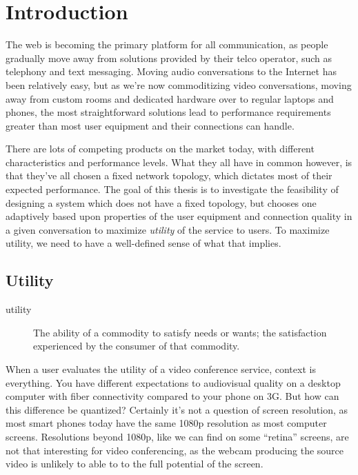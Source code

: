 \chapter{Introduction}\label{chp:introduction}

The web is becoming the primary platform for all communication, as people gradually move away from solutions provided by their telco operator, such as telephony and text messaging. Moving audio conversations to the Internet has been relatively easy, but as we're now commoditizing video conversations, moving away from custom rooms and dedicated hardware over to regular laptops and phones, the most straightforward solutions lead to performance requirements greater than most user equipment and their connections can handle.

There are lots of competing products on the market today, with different characteristics and performance levels. What they all have in common however, is that they've all chosen a fixed network topology, which dictates most of their expected performance. The goal of this thesis is to investigate the feasibility of designing a system which does not have a fixed topology, but chooses one adaptively based upon properties of the user equipment and connection quality in a given conversation to maximize \emph{utility} of the service to users. To maximize utility, we need to have a well-defined sense of what that implies.


\section{Utility}

\begin{description}

    \item[utility]  The ability of a commodity to satisfy needs or wants; the satisfaction experienced by the consumer of that commodity.
\end{description}

When a user evaluates the utility of a video conference service, context is everything. You have different expectations to audiovisual quality on a desktop computer with fiber connectivity compared to your phone on 3G. But how can this difference be quantized? Certainly it's not a question of screen resolution, as most smart phones today have the same 1080p resolution as most computer screens. Resolutions beyond 1080p, like we can find on some ``retina'' screens, are not that interesting for video conferencing, as the webcam producing the source video is unlikely to able to to the full potential of the screen.

